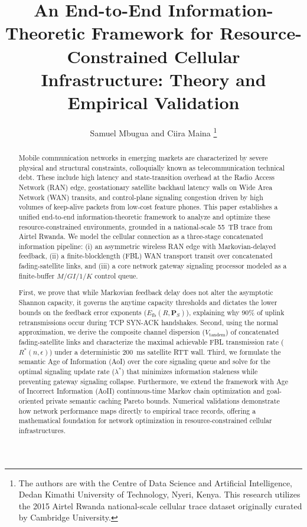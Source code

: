 \documentclass[journal]{IEEEtran}
\begin{document}
\title{An End-to-End Information-Theoretic Framework for Resource-Constrained Cellular Infrastructure: Theory and Empirical Validation}

\author{Samuel Mbugua and Ciira Maina
\thanks{The authors are with the Centre of Data Science and Artificial Intelligence, Dedan Kimathi University of Technology, Nyeri, Kenya. This research utilizes the 2015 Airtel Rwanda national-scale cellular trace dataset originally curated by Cambridge University.}}

\maketitle

\begin{abstract}
Mobile communication networks in emerging markets are characterized by severe physical and structural constraints, colloquially known as telecommunication technical debt. These include high latency and state-transition overhead at the Radio Access Network (RAN) edge, geostationary satellite backhaul latency walls on Wide Area Network (WAN) transits, and control-plane signaling congestion driven by high volumes of keep-alive packets from low-cost feature phones. This paper establishes a unified end-to-end information-theoretic framework to analyze and optimize these resource-constrained environments, grounded in a national-scale 55~TB trace from Airtel Rwanda. We model the cellular connection as a three-stage concatenated information pipeline: (i) an asymmetric wireless RAN edge with Markovian-delayed feedback, (ii) a finite-blocklength (FBL) WAN transport transit over concatenated fading-satellite links, and (iii) a core network gateway signaling processor modeled as a finite-buffer $M/GI/1/K$ control queue.

First, we prove that while Markovian feedback delay does not alter the asymptotic Shannon capacity, it governs the anytime capacity thresholds and dictates the lower bounds on the feedback error exponents ($E_{\text{fb}}(R, \mathbf{P}_S)$), explaining why 90\% of uplink retransmissions occur during TCP SYN-ACK handshakes. Second, using the normal approximation, we derive the composite channel dispersion ($V_{\text{tandem}}$) of concatenated fading-satellite links and characterize the maximal achievable FBL transmission rate ($R^*(n, \epsilon)$) under a deterministic 200~ms satellite RTT wall. Third, we formulate the semantic Age of Information (AoI) over the core signaling queue and solve for the optimal signaling update rate ($\lambda^*$) that minimizes information staleness while preventing gateway signaling collapse. Furthermore, we extend the framework with Age of Incorrect Information (AoII) continuous-time Markov chain optimization and goal-oriented private semantic caching Pareto bounds. Numerical validations demonstrate how network performance maps directly to empirical trace records, offering a mathematical foundation for network optimization in resource-constrained cellular infrastructures.
\end{abstract}
\end{document}
